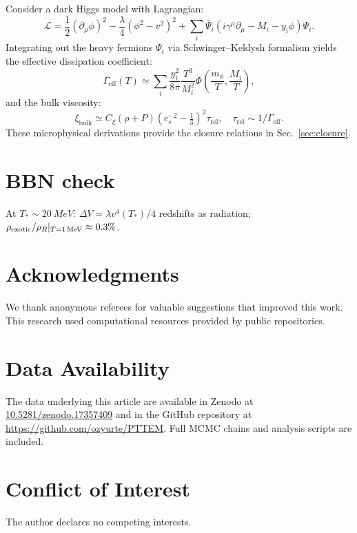 \documentclass[preprint,aps,prd,onecolumn,nofootinbib,longbibliography]{revtex4-2}
\numberwithin{equation}{section}
\begin{document}
Consider a dark Higgs model with Lagrangian:
\begin{equation}
\mathcal{L} = \frac{1}{2} (\partial_\mu \phi)^2 - \frac{\lambda}{4} (\phi^2 - v^2)^2 + \sum_i \bar{\Psi}_i (i \gamma^\mu \partial_\mu - M_i - y_i \phi) \Psi_i.
\end{equation}
Integrating out the heavy fermions $ \Psi_i $ via Schwinger--Keldysh formalism yields the effective dissipation coefficient:
\begin{equation}
\Gamma_{\mathrm{eff}}(T) \simeq \sum_i \frac{y_i^2}{8\pi} \frac{T^3}{M_i^2} \Phi\left( \frac{m_\phi}{T}, \frac{M_i}{T} \right),
\end{equation}
and the bulk viscosity:
\begin{equation}
\xi_{\mathrm{bulk}} \simeq C_\xi (\rho + P) (c_s^{-2} - \tfrac{1}{3})^2 \tau_{\mathrm{rel}}, \quad \tau_{\mathrm{rel}} \sim 1 / \Gamma_{\mathrm{eff}}.
\end{equation}
These microphysical derivations provide the closure relations in Sec.~\ref{sec:closure}.

\section{BBN check}
\label{app:bbn}
At $T_*\!\sim\!\SI{20}{MeV}$: $\Delta V=\lambda v^4(T_*)/4$ redshifts as radiation; $\rho_{\rm exotic}/\rho_R|_{T=\SI{1}{MeV}}\approx 0.3\%$.

\section*{Acknowledgments}
We thank anonymous referees for valuable suggestions that improved this work. This research used computational resources provided by public repositories.

\section*{Data Availability}
The data underlying this article are available in Zenodo at \url{10.5281/zenodo.17357409} and in the GitHub repository at \url{https://github.com/ozyurte/PTTEM}. Full MCMC chains and analysis scripts are included.

\section*{Conflict of Interest}
The author declares no competing interests.

\FloatBarrier
\end{document}
